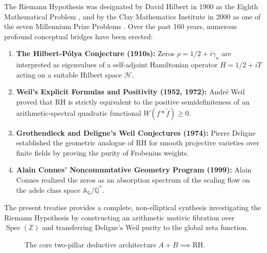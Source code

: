 \documentclass[11pt,a4paper]{article}
\theoremstyle{definition}
\begin{document}
The Riemann Hypothesis was designated by David Hilbert in 1900 as the Eighth Mathematical Problem \cite{hilbert1900}, and by the Clay Mathematics Institute in 2000 as one of the seven Millennium Prize Problems \cite{bombieri2000}. Over the past 160 years, numerous profound conceptual bridges have been erected:
\begin{enumerate}
    \item \textbf{The Hilbert-Pólya Conjecture (1910s):} Zeros $\rho = 1/2 + i\gamma_n$ are interpreted as eigenvalues of a self-adjoint Hamiltonian operator $H = 1/2 + i T$ acting on a suitable Hilbert space $\mathcal{H}$.
    \item \textbf{Weil's Explicit Formulas and Positivity (1952, 1972):} André Weil \cite{weil1952, weil1972} proved that RH is strictly equivalent to the positive semidefiniteness of an arithmetic-spectral quadratic functional $W(f \ast \tilde{f}) \ge 0$.
    \item \textbf{Grothendieck and Deligne's Weil Conjectures (1974):} Pierre Deligne \cite{deligne1974} established the geometric analogue of RH for smooth projective varieties over finite fields by proving the purity of Frobenius weights.
    \item \textbf{Alain Connes' Noncommutative Geometry Program (1999):} Alain Connes \cite{connes1999} realized the zeros as an absorption spectrum of the scaling flow on the adele class space $\mathbb{A}_{\mathbb{Q}} / \mathbb{Q}^*$.
\end{enumerate}

The present treatise provides a complete, non-elliptical synthesis investigating the Riemann Hypothesis by constructing an arithmetic motivic fibration over $\operatorname{Spec}(\mathbb{Z})$ and transferring Deligne's Weil purity to the global zeta function.

\begin{figure}[htbp]
\centering
{}
\caption{The core two-pillar deductive architecture $A + B \implies \text{RH}$.}
\label{fig:rh_deduction_arch}
\end{figure}
\end{document}
